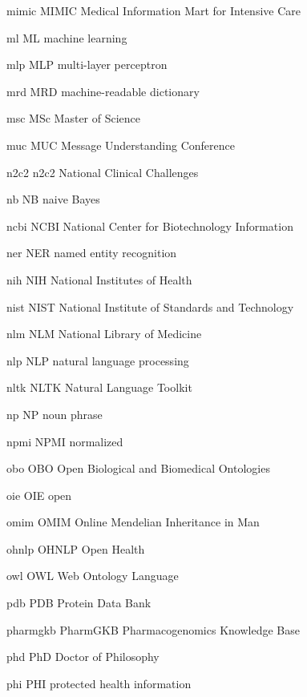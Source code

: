 \newabbreviation
{mimic}
{MIMIC}
{Medical Information Mart for Intensive Care}

\newabbreviation
{ml}
{ML}
{machine learning}

\newabbreviation
{mlp}
{MLP}
{multi-layer perceptron}

\newabbreviation
{mrd}
{MRD}
{machine-readable dictionary}

\newabbreviation
{msc}
{MSc}
{Master of Science}

\newabbreviation
{muc}
{MUC}
{Message Understanding Conference}

\newabbreviation
{n2c2}
{n2c2}
{National  Clinical Challenges}

\newabbreviation
{nb}
{NB}
{naive Bayes}

\newabbreviation
{ncbi}
{NCBI}
{National Center for Biotechnology Information}

\newabbreviation
{ner}
{NER}
{named entity recognition}

\newabbreviation
{nih}
{NIH}
{National Institutes of Health}

\newabbreviation
{nist}
{NIST}
{National Institute of Standards and Technology}

\newabbreviation
{nlm}
{NLM}
{National Library of Medicine}

\newabbreviation
{nlp}
{NLP}
{natural language processing}

\newabbreviation
{nltk}
{NLTK}
{Natural Language Toolkit}

\newabbreviation
{np}
{NP}
{noun phrase}

\newabbreviation
{npmi}
{NPMI}
{normalized }

\newabbreviation
{obo}
{OBO}
{Open Biological and Biomedical Ontologies}

\newabbreviation
{oie}
{OIE}
{open }

\newabbreviation
{omim}
{OMIM}
{Online Mendelian Inheritance in Man}

\newabbreviation
{ohnlp}
{OHNLP}
{Open Health }

\newabbreviation
{owl}
{OWL}
{Web Ontology Language}

\newabbreviation
{pdb}
{PDB}
{Protein Data Bank}

\newabbreviation
{pharmgkb}
{PharmGKB}
{Pharmacogenomics Knowledge Base}

\newabbreviation
{phd}
{PhD}
{Doctor of Philosophy}

\newabbreviation
{phi}
{PHI}
{protected health information}

